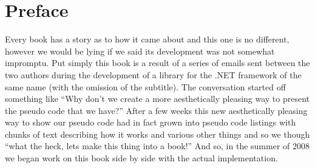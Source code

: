 \chapter*{Preface}
Every book has a story as to how it came about and this one is no different, however we would be lying if we said its development was not somewhat impromptu. Put simply this book is a result of a series of emails sent between the two authors during the development of a library for the .NET framework of the same name (with the omission of the subtitle). The conversation started off something like ``Why don't we create a more aesthetically pleasing way to present the pseudo code that we have?'' After a few weeks this new aesthetically pleasing way to show our pseudo code had in fact grown into pseudo code listings with chunks of text describing how it works and various other things and so we though ``what the heck, lets make this thing into a book!'' And so, in the summer of 2008 we began work on this book side by side with the actual implementation.


